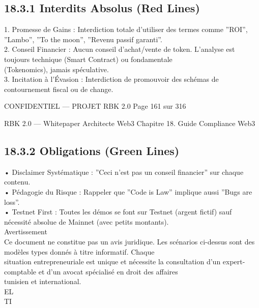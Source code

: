 \subsection{18.3.1 Interdits Absolus (Red Lines)}
1. Promesse de Gains : Interdiction totale d’utiliser des termes comme ”ROI”, ”Lambo”, ”To the moon”, ”Revenu passif garanti”.\\
\vspace{0.5em}
2. Conseil Financier : Aucun conseil d’achat/vente de token. L’analyse est toujours technique (Smart Contract) ou fondamentale\\
(Tokenomics), jamais spéculative.\\
\vspace{0.5em}
3. Incitation à l’Évasion : Interdiction de promouvoir des schémas de contournement fiscal ou de change.\\
\vspace{0.5em}
\vspace{0.5em}
\begin{confidential}CONFIDENTIEL — PROJET RBK 2.0                                  Page 161 sur 316\end{confidential}
RBK 2.0 — Whitepaper Architecte Web3                                                                                    Chapitre 18. Guide Compliance Web3\\
\vspace{0.5em}
\vspace{0.5em}
\subsection{18.3.2 Obligations (Green Lines)}
• Disclaimer Systématique : ”Ceci n’est pas un conseil financier” sur chaque contenu.\\
\vspace{0.5em}
• Pédagogie du Risque : Rappeler que ”Code is Law” implique aussi ”Bugs are loss”.\\
\vspace{0.5em}
• Testnet First : Toutes les démos se font sur Testnet (argent fictif) sauf nécessité absolue de Mainnet (avec petits montants).\\
\vspace{0.5em}
Avertissement\\
Ce document ne constitue pas un avis juridique. Les scénarios ci-dessus sont des modèles types donnés à titre informatif. Chaque\\
situation entrepreneuriale est unique et nécessite la consultation d’un expert-comptable et d’un avocat spécialisé en droit des affaires\\
tunisien et international.\\
\vspace{0.5em}
\vspace{0.5em}
\vspace{0.5em}
\vspace{0.5em}
EL\\
TI\\
